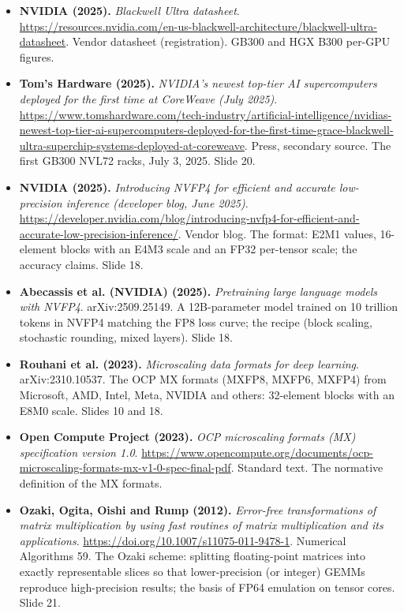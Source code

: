 \begin{itemize}[leftmargin=1.2em,itemsep=3pt]
\item \textbf{NVIDIA (2025).} \textit{Blackwell Ultra datasheet}. \url{https://resources.nvidia.com/en-us-blackwell-architecture/blackwell-ultra-datasheet}. Vendor datasheet (registration). GB300 and HGX B300 per-GPU figures.
\item \textbf{Tom's Hardware (2025).} \textit{NVIDIA's newest top-tier AI supercomputers deployed for the first time at CoreWeave (July 2025)}. \url{https://www.tomshardware.com/tech-industry/artificial-intelligence/nvidias-newest-top-tier-ai-supercomputers-deployed-for-the-first-time-grace-blackwell-ultra-superchip-systems-deployed-at-coreweave}. Press, secondary source. The first GB300 NVL72 racks, July 3, 2025. Slide 20.
\item \textbf{NVIDIA (2025).} \textit{Introducing NVFP4 for efficient and accurate low-precision inference (developer blog, June 2025)}. \url{https://developer.nvidia.com/blog/introducing-nvfp4-for-efficient-and-accurate-low-precision-inference/}. Vendor blog. The format: E2M1 values, 16-element blocks with an E4M3 scale and an FP32 per-tensor scale; the accuracy claims. Slide 18.
\item \textbf{Abecassis et al. (NVIDIA) (2025).} \textit{Pretraining large language models with NVFP4}. arXiv:2509.25149. A 12B-parameter model trained on 10 trillion tokens in NVFP4 matching the FP8 loss curve; the recipe (block scaling, stochastic rounding, mixed layers). Slide 18.
\item \textbf{Rouhani et al. (2023).} \textit{Microscaling data formats for deep learning}. arXiv:2310.10537. The OCP MX formats (MXFP8, MXFP6, MXFP4) from Microsoft, AMD, Intel, Meta, NVIDIA and others: 32-element blocks with an E8M0 scale. Slides 10 and 18.
\item \textbf{Open Compute Project (2023).} \textit{OCP microscaling formats (MX) specification version 1.0}. \url{https://www.opencompute.org/documents/ocp-microscaling-formats-mx-v1-0-spec-final-pdf}. Standard text. The normative definition of the MX formats.
\item \textbf{Ozaki, Ogita, Oishi and Rump (2012).} \textit{Error-free transformations of matrix multiplication by using fast routines of matrix multiplication and its applications}. \url{https://doi.org/10.1007/s11075-011-9478-1}. Numerical Algorithms 59. The Ozaki scheme: splitting floating-point matrices into exactly representable slices so that lower-precision (or integer) GEMMs reproduce high-precision results; the basis of FP64 emulation on tensor cores. Slide 21.

\end{itemize}
